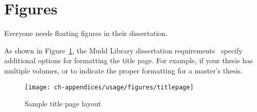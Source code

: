 \section{Figures}
\label{sec:usage:figures}

Everyone needs floating figures in their dissertation. 

As shown in Figure~\ref{fig:usage:titlepage}, the Mudd Library dissertation requirements~\cite{muddthesis2009} specify additional options for formatting the title page. For example, if your thesis has multiple volumes, or to indicate the proper formatting for a master's thesis.

\begin{figure}[htb]
  \begin{center}
    \texttt{[image: ch-appendices/usage/figures/titlepage]}
    \caption[Sample Title Page Layout]{Sample title page layout~\cite{muddthesis2009}}
    \label{fig:usage:titlepage}
  \end{center}
\end{figure}

